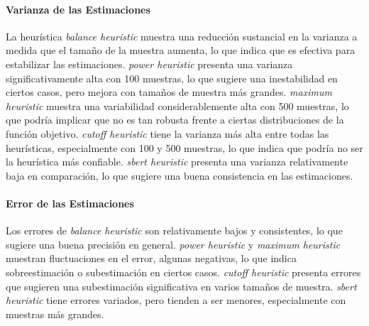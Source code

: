 \documentclass{article}
\begin{document}
\begin{table}[H]
\centering
\label{table:heuristic_analysis}
\caption{Análisis de los resultados por heurística}
\end{table}

\paragraph{Varianza de las Estimaciones}
La heurística \textit{balance heuristic} muestra una reducción sustancial en la varianza a medida que el tamaño de la muestra aumenta, lo que indica que es efectiva para estabilizar las estimaciones.
\textit{power heuristic} presenta una varianza significativamente alta con 100 muestras, lo que sugiere una inestabilidad en ciertos casos, pero mejora con tamaños de muestra más grandes.
\textit{maximum heuristic} muestra una variabilidad considerablemente alta con 500 muestras, lo que podría implicar que no es tan robusta frente a ciertas distribuciones de la función objetivo.
\textit{cutoff heuristic} tiene la varianza más alta entre todas las heurísticas, especialmente con 100 y 500 muestras, lo que indica que podría no ser la heurística más confiable.
\textit{sbert heuristic} presenta una varianza relativamente baja en comparación, lo que sugiere una buena consistencia en las estimaciones.

\paragraph{Error de las Estimaciones}
Los errores de \textit{balance heuristic} son relativamente bajos y consistentes, lo que sugiere una buena precisión en general.
\textit{power heuristic} y \textit{maximum heuristic} muestran fluctuaciones en el error, algunas negativas, lo que indica sobreestimación o subestimación en ciertos casos.
\textit{cutoff heuristic} presenta errores que sugieren una subestimación significativa en varios tamaños de muestra.
\textit{sbert heuristic} tiene errores variados, pero tienden a ser menores, especialmente con muestras más grandes.
\end{document}
